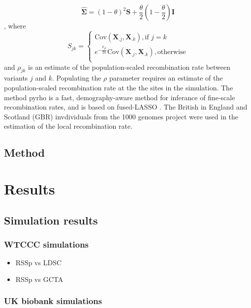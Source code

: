 {$$\boldsymbol{\hat{\Sigma}} = (1-\theta)^2 \textbf{S}+\frac{\theta}{2} \left(1-\frac{\theta}{2}\right)\textbf{I}$$, where 
$$ S_{jk} = \begin{cases}
\text{Cov}(\boldsymbol{X}_{.j},\boldsymbol{X}_{.k}), \text{if } j=k \\
e^{-\frac{\rho_{jk}}{2n}}\text{Cov}(\boldsymbol{X}_{.j},\boldsymbol{X}_{.k}), \text{otherwise}\\
\end{cases} $$
and \(\rho_{jk}\) is an estimate of the population-scaled recombination rate between variants \(j\) and \(k\). Populating the \(\rho\) parameter requires an estimate
of the population-scaled recombination rate at the the sites in the simulation.  The method pyrho is a fast, demography-aware method for inferance of fine-scale recombination rates, and is based on
fused-LASSO \cite{Spence_2019}. The British in England and Scotland (GBR) invdividuals from the 1000 genomes project \cite{1kg} were used in the estimation of the local recombination rate.


\subsection{Method}\label{sec:org259b807}



\section{Results}\label{sec:org26555b8}


\subsection{Simulation results}\label{sec:orgdb752e7}

\subsubsection{WTCCC simulations}\label{sec:org75a6a66}

\begin{itemize}
\item RSSp vs LDSC\label{sec:org48df19d}

\item RSSp vs GCTA\label{sec:org43d585c}
\end{itemize}


\subsubsection{UK biobank simulations}\label{sec:org0fa2c7f}

}
